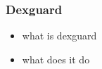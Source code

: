 \subsubsection{Dexguard} \label{subsection:counter-obfuscation-solution-dexguard}
\begin{itemize}
  \item what is dexguard
  \item what does it do
\end{itemize}
